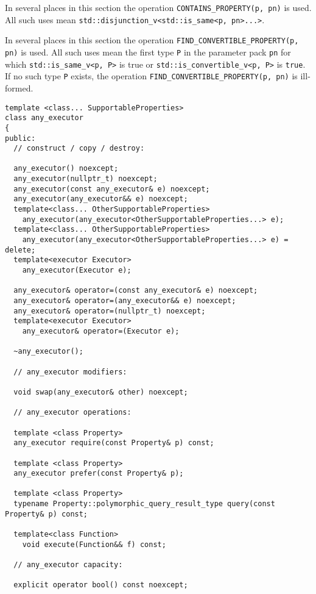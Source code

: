 \documentclass[a4paper,12pt,notitlepage,twoside,openright]{article}
\begin{document}
In several places in this section the operation
\texttt{CONTAINS_PROPERTY(p, pn)} is used. All such uses
mean \texttt{std::disjunction_v<std::is_same<p, pn>...>}.

In several places in this section the operation
\texttt{FIND_CONVERTIBLE_PROPERTY(p, pn)} is used. All such
uses mean the first type \texttt{P} in the parameter pack
\texttt{pn} for which
\texttt{std::is_same_v<p, P>} is true or
\texttt{std::is_convertible_v<p, P>} is
\texttt{true}. If no such type \texttt{P}
exists, the operation
\texttt{FIND_CONVERTIBLE_PROPERTY(p, pn)} is ill-formed.

\begin{verbatim}
template <class... SupportableProperties>
class any_executor
{
public:
  // construct / copy / destroy:

  any_executor() noexcept;
  any_executor(nullptr_t) noexcept;
  any_executor(const any_executor& e) noexcept;
  any_executor(any_executor&& e) noexcept;
  template<class... OtherSupportableProperties>
    any_executor(any_executor<OtherSupportableProperties...> e);
  template<class... OtherSupportableProperties>
    any_executor(any_executor<OtherSupportableProperties...> e) = delete;
  template<executor Executor>
    any_executor(Executor e);

  any_executor& operator=(const any_executor& e) noexcept;
  any_executor& operator=(any_executor&& e) noexcept;
  any_executor& operator=(nullptr_t) noexcept;
  template<executor Executor>
    any_executor& operator=(Executor e);

  ~any_executor();

  // any_executor modifiers:

  void swap(any_executor& other) noexcept;

  // any_executor operations:

  template <class Property>
  any_executor require(const Property& p) const;

  template <class Property>
  any_executor prefer(const Property& p);

  template <class Property>
  typename Property::polymorphic_query_result_type query(const Property& p) const;

  template<class Function>
    void execute(Function&& f) const;

  // any_executor capacity:

  explicit operator bool() const noexcept;


\end{verbatim}
\end{document}
